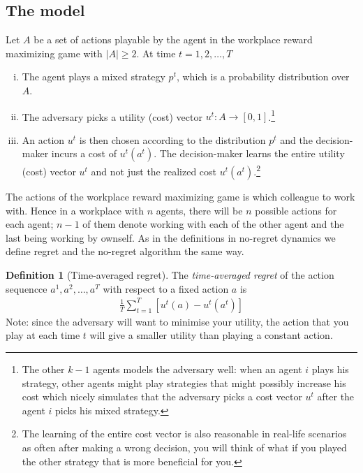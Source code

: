 \documentclass[a4paper,10pt]{article}
\theoremstyle{definition}
\newtheorem{defn}[thm]{Definition}
\begin{document}
\subsection*{The model} 
Let $A$ be a set of actions playable by the agent in the workplace reward maximizing game with $|A|\geq 2$. At time $t=1,2,\ldots, T$
\begin{enumerate}[(i)]
\item The agent plays a mixed strategy $p^t$, which is a probability distribution over $A$.
\item The adversary picks a utility (cost) vector $u^t: A \to [0,1]$.\footnote{The other $k-1$ agents models the adversary well: when an agent $i$ plays his strategy, other agents might play strategies that might possibly increase his cost which nicely simulates that the adversary picks a cost vector $u^t$ after the agent $i$ picks his mixed strategy.}
\item An action $u^t$ is then chosen according to the distribution $p^t$ and the decision-maker incurs a cost of $u^t(a^t)$. The decision-maker learns the entire utility (cost) vector $u^t$ and not just the realized cost $u^t(a^t)$.\footnote{The learning of the entire cost vector is also reasonable in real-life scenarios as often after making a wrong decision, you will think of what if you played the other strategy that is more beneficial for you.}
\end{enumerate}

The actions of the workplace reward maximizing game is which colleague to work with. Hence in a workplace with $n$ agents, there will be $n$ possible actions for each agent; $n-1$ of them denote working with each of the other agent and the last being working by ownself. %
As in the definitions in no-regret dynamics we define regret and the no-regret algorithm the same way.

\begin{defn}[Time-averaged regret]
The \emph{time-averaged regret} of the action sequencce $a^1,a^2,\ldots, a^T$ with respect to a fixed action $a$ is 
\begin{align*}
\frac{1}{T}\sum_{t=1}^{T}\left[u^t(a)-u^t(a^t)\right]%
\end{align*}	
Note: since the adversary will want to minimise your utility, the action that you play at each time $t$ will give a smaller utility than playing a constant action.
\end{defn}
\end{document}
